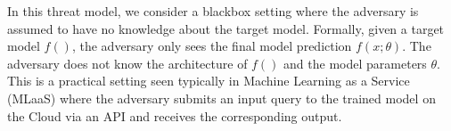 In this threat model, we consider a blackbox setting where the adversary is assumed to have no knowledge about the target model.
Formally, given a target model $f()$, the adversary only sees the final model prediction $f(x;\theta)$.
The adversary does not know the architecture of $f()$ and the model parameters $\theta$.
This is a practical setting seen typically in Machine Learning as a Service (MLaaS) where the adversary submits an input query to the trained model on the Cloud via an API and receives the corresponding output.

